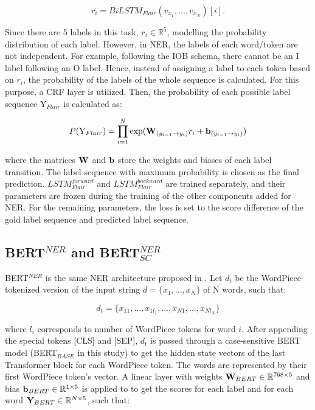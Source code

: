 \documentclass{report}
\theoremstyle{definition}
\theoremstyle{remark}
\begin{document}
\begin{equation}
    r_i = BiLSTM_{Flair}(v_{x_1},...,v_{x_N})[i].
\end{equation}

Since there are 5 labels in this task, $r_i \in \mathbb{R}^5$, modelling the probability distribution of each label. However, in NER, the labels of each word/token are not independent. For example, following the IOB schema, there cannot be an I label following an O label. Hence, instead of assigning a label to each token based on $r_i$, the probability of the labels of the whole sequence is calculated. For this purpose, a CRF layer is utilized. Then, the probability of each possible label sequence $\text{Y}_{Flair}$ is calculated as:

\begin{equation}
    P(\text{Y}_{Flair}) = \prod_{i=1}^N \text{exp}( \bold{W}_{(y_{i-1} \rightarrow y_i)}r_i + \bold{b}_{(y_{i-1} \rightarrow y_i)})
\end{equation}

\noindent where the matrices $\bold{W}$ and $\bold{b}$ store the weights and biases of each label transition. The label sequence with maximum probability is chosen as the final prediction. $LSTM^{forward}_{Flair}$ and $LSTM^{backward}_{Flair}$ are trained separately, and their parameters are frozen during the training of the other components added for NER. For the remaining parameters, the loss is set to the score difference of the gold label sequence and predicted label sequence.

\subsection{BERT$^{NER}$ and BERT$^{NER}_{SC}$}
BERT$^{NER}$ is the same NER architecture proposed in \cite{BERT}. Let $d_t$ be the WordPiece-tokenized version of the input string $d=\{x_1,...,x_N\}$ of N words, such that:

\begin{equation}
    d_t = \{x_{11},...,x_{1l_{1}},...,x_{N1},...,x_{Nl_{N}}\}
\end{equation}

\noindent where $l_i$ corresponds to number of WordPiece tokens for word $i$. After appending the special tokens [CLS] and [SEP], $d_t$ is passed through a case-sensitive BERT model (BERT$_{BASE}$ in this study) to get the hidden state vectors of the last Transformer block for each WordPiece token. The words are represented by their first WordPiece token's vector. A linear layer with weights $\bold{W}_{BERT} \in \mathbb{R}^{768\times5}$ and bias $\bold{b}_{BERT} \in \mathbb{R}^{1\times5}$ is applied to to get the scores for each label and for each word $\bold{Y}_{BERT} \in \mathbb{R}^{N\times5}$, such that:
\end{document}
